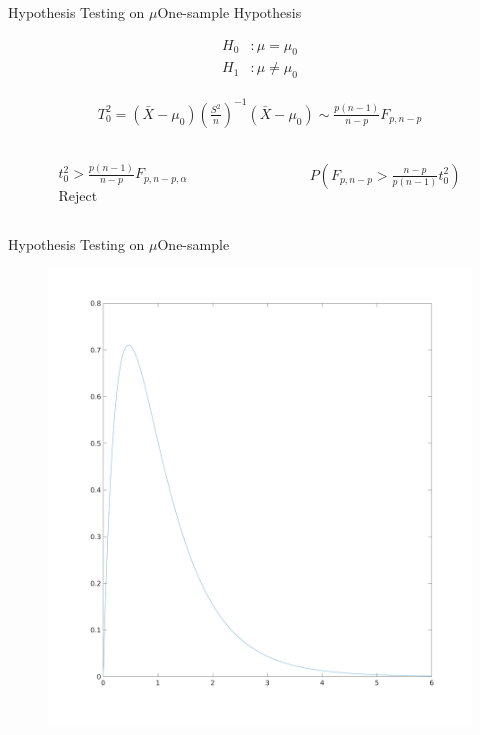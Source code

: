 \documentclass[aspectratio=169,10pt,t]{beamer}
\begin{document}
\begin{frame}{Hypothesis Testing on $\mu$}{One-sample}
	Hypothesis

	\begin{align*}
		H_0&: \mu = \mu_0\\
		H_1&: \mu \neq \mu_0
	\end{align*}

	\begin{align*}
		T^2_0 = ( \bar{X} - \mu_0) \left(\frac{S^2}{n}\right)^{-1} ( \bar{X} -\mu_0 ) \sim \frac{p(n-1)}{n-p} F_{p,n-p}
	\end{align*}

	\begin{columns}
		\begin{column}{0.5\textwidth}
			\begin{align*}
				t^2_0 > \frac{p(n-1)}{n-p} F_{p,n-p,\alpha } \\
				\text{Reject}
			\end{align*}
		\end{column}
		\begin{column}{0.5\textwidth}
			\begin{align*}
				P( F_{p,n-p} > \frac{n-p}{p(n-1)} t_0^2 )
			\end{align*}
		\end{column}
	\end{columns}



\end{frame}

\begin{frame}{Hypothesis Testing on $\mu$}{One-sample}
	\begin{figure}[H]
		\centering
		\includegraphics[scale=0.15]{images/f.png}
	\end{figure} 
\end{frame}
\end{document}
